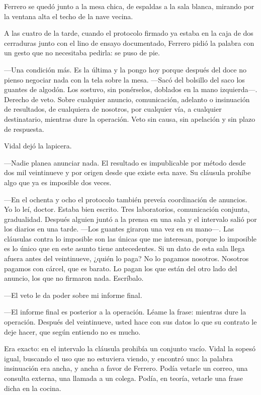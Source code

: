 Ferrero se quedó junto a la mesa chica, de espaldas a la sala blanca, mirando por la ventana alta el techo de la nave vecina.

A las cuatro de la tarde, cuando el protocolo firmado ya estaba en la caja de dos cerraduras junto con el lino de ensayo documentado, Ferrero pidió la palabra con un gesto que no necesitaba pedirla: se puso de pie.

---Una condición más. Es la última y la pongo hoy porque después del doce no pienso negociar nada con la tela sobre la mesa. ---Sacó del bolsillo del saco los guantes de algodón. Los sostuvo, sin ponérselos, doblados en la mano izquierda---. Derecho de veto. Sobre cualquier anuncio, comunicación, adelanto o insinuación de resultados, de cualquiera de nosotros, por cualquier vía, a cualquier destinatario, mientras dure la operación. Veto sin causa, sin apelación y sin plazo de respuesta.

Vidal dejó la lapicera.

---Nadie planea anunciar nada. El resultado es impublicable por método desde dos mil veintinueve y por origen desde que existe esta nave. Su cláusula prohíbe algo que ya es imposible dos veces.

---En el ochenta y ocho el protocolo también preveía coordinación de anuncios. Yo lo leí, doctor. Estaba bien escrito. Tres laboratorios, comunicación conjunta, gradualidad. Después alguien juntó a la prensa en una sala y el intervalo salió por los diarios en una tarde. ---Los guantes giraron una vez en su mano---. Las cláusulas contra lo imposible son las únicas que me interesan, porque lo imposible es lo único que en este asunto tiene antecedentes. Si un dato de esta sala llega afuera antes del veintinueve, ¿quién lo paga? No lo pagamos nosotros. Nosotros pagamos con cárcel, que es barato. Lo pagan los que están del otro lado del anuncio, los que no firmaron nada. Escríbalo.

---El veto le da poder sobre mi informe final.

---El informe final es posterior a la operación. Léame la frase: mientras dure la operación. Después del veintinueve, usted hace con sus datos lo que su contrato le deje hacer, que según entiendo no es mucho.

Era exacto: en el intervalo la cláusula prohibía un conjunto vacío. Vidal la sopesó igual, buscando el uso que no estuviera viendo, y encontró uno: la palabra insinuación era ancha, y ancha a favor de Ferrero. Podía vetarle un correo, una consulta externa, una llamada a un colega. Podía, en teoría, vetarle una frase dicha en la cocina.

